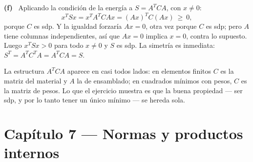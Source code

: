 \documentclass[11pt,a4paper]{article}
\newcounter{entrega}[section]
\newcommand{\itemsol}[1]{\par\medskip\noindent\textbf{(#1)}\ \ignorespaces}
\begin{document}
\itemsol{f} Aplicando la condición de la energía a $S=A^TCA$, con $x\neq0$:
\[
x^TSx=x^TA^TCAx=(Ax)^TC(Ax)\ \ge\ 0 ,
\]
porque $C$ es sdp. Y la igualdad forzaría $Ax=0$, otra vez porque $C$ es sdp;
pero $A$ tiene columnas independientes, así que $Ax=0$ implica $x=0$, contra lo
supuesto. Luego $x^TSx>0$ para todo $x\neq0$ y $S$ es sdp. La simetría es
inmediata: $S^T=A^TC^TA=A^TCA=S$.

La estructura $A^TCA$ aparece en casi todos lados: en elementos finitos $C$ es la
matriz del material y $A$ la de ensamblado; en cuadrados mínimos con pesos, $C$
es la matriz de pesos. Lo que el ejercicio muestra es que la buena propiedad ---
ser sdp, y por lo tanto tener un único mínimo --- se hereda sola.


\clearpage
\section{Capítulo 7 --- Normas y productos internos}
\setcounter{entrega}{0}
\end{document}

